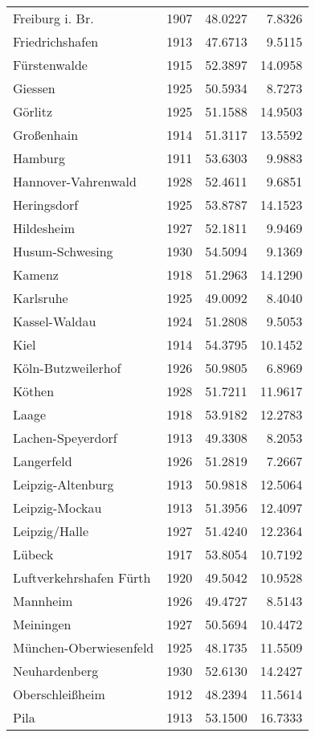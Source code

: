 \begin{table}[h!]
\begin{tabular}{p{2.8cm}rrr}
  Freiburg i. Br. & 1907 & 48.0227 & 7.8326 \\ 
  Friedrichshafen & 1913 & 47.6713 & 9.5115 \\ 
  Fürstenwalde & 1915 & 52.3897 & 14.0958 \\ 
  Giessen & 1925 & 50.5934 & 8.7273 \\ 
  Görlitz & 1925 & 51.1588 & 14.9503 \\ 
   \midrule
Großenhain & 1914 & 51.3117 & 13.5592 \\ 
  Hamburg  & 1911 & 53.6303 & 9.9883 \\ 
  Hannover-Vahrenwald & 1928 & 52.4611 & 9.6851 \\ 
  Heringsdorf & 1925 & 53.8787 & 14.1523 \\ 
  Hildesheim & 1927 & 52.1811 & 9.9469 \\ 
  Husum-Schwesing & 1930 & 54.5094 & 9.1369 \\ 
  Kamenz & 1918 & 51.2963 & 14.1290 \\ 
  Karlsruhe & 1925 & 49.0092 & 8.4040 \\ 
  Kassel-Waldau & 1924 & 51.2808 & 9.5053 \\ 
  Kiel & 1914 & 54.3795 & 10.1452 \\ 
   \midrule
Köln-Butzweilerhof & 1926 & 50.9805 & 6.8969 \\ 
  Köthen & 1928 & 51.7211 & 11.9617 \\ 
  Laage & 1918 & 53.9182 & 12.2783 \\ 
  Lachen-Speyerdorf & 1913 & 49.3308 & 8.2053 \\ 
  Langerfeld & 1926 & 51.2819 & 7.2667 \\ 
  Leipzig-Altenburg & 1913 & 50.9818 & 12.5064 \\ 
  Leipzig-Mockau & 1913 & 51.3956 & 12.4097 \\ 
  Leipzig/Halle  & 1927 & 51.4240 & 12.2364 \\ 
  Lübeck & 1917 & 53.8054 & 10.7192 \\ 
  Luftverkehrshafen Fürth & 1920 & 49.5042 & 10.9528 \\ 
   \midrule
Mannheim & 1926 & 49.4727 & 8.5143 \\ 
  Meiningen & 1927 & 50.5694 & 10.4472 \\ 
  München-Oberwiesenfeld & 1925 & 48.1735 & 11.5509 \\ 
  Neuhardenberg & 1930 & 52.6130 & 14.2427 \\ 
  Oberschleißheim & 1912 & 48.2394 & 11.5614 \\ 
  Pila & 1913 & 53.1500 & 16.7333 \\ 

\end{tabular}
\end{table}
